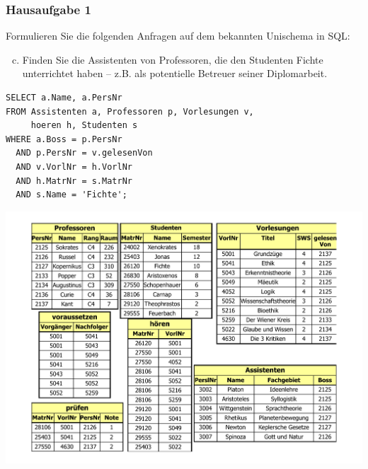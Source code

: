 \begin{frame}[fragile]
	\frametitle{Hausaufgabe 1}
	\vspace{0.5cm}

	\begin{multicols}{2}
		Formulieren Sie die folgenden Anfragen auf dem bekannten Unischema in SQL:
		\begin{enumerate}[a)]
			\setcounter{enumi}{2}
			\item Finden Sie die Assistenten von Professoren, die den Studenten Fichte unterrichtet haben – z.B. als potentielle Betreuer seiner Diplomarbeit.
		\end{enumerate}
		\begin{verbatim}
SELECT a.Name, a.PersNr
FROM Assistenten a, Professoren p, Vorlesungen v, 
	 hoeren h, Studenten s
WHERE a.Boss = p.PersNr
  AND p.PersNr = v.gelesenVon
  AND v.VorlNr = h.VorlNr
  AND h.MatrNr = s.MatrNr
  AND s.Name = 'Fichte';
		\end{verbatim}
		\vfill\columnbreak

		\begin{center}
			\includegraphics[height=.6\paperheight]{../img/uni.pdf}
		\end{center}
	\end{multicols}
\end{frame}


